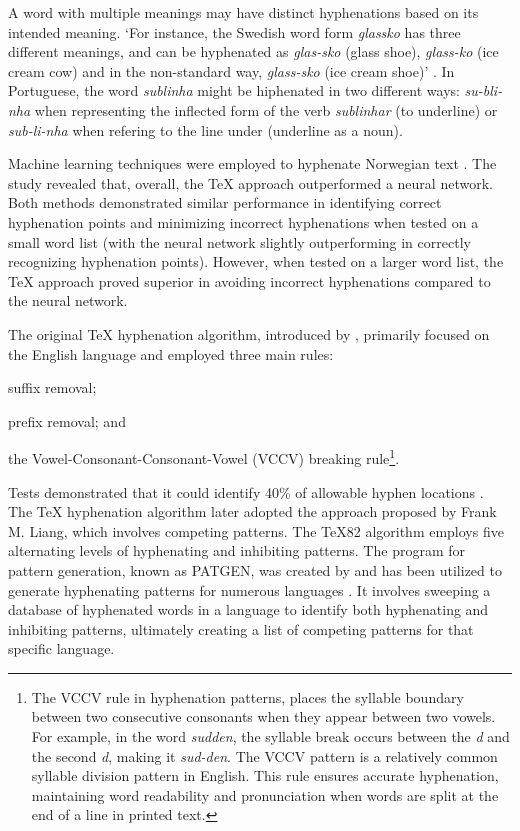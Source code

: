 \documentclass{article}
\begin{document}
A word with multiple meanings may have distinct hyphenations based on its intended meaning.
`For instance, the Swedish word form \emph{glassko} has three different
meanings, and can be hyphenated as \emph{glas-sko} (glass shoe),
\emph{glass-ko} (ice cream cow) and in the non-standard way,
\emph{glass-sko} (ice cream shoe)' \parencite{nemeth2006}. In Portuguese, the
word \emph{sublinha} might be hiphenated in two different ways:
\emph{su-bli-nha} when representing the inflected form of the verb
\emph{sublinhar} (to underline) or \emph{sub-li-nha} when refering
to the line under (underline as a noun).


Machine learning techniques were employed to hyphenate Norwegian text
\parencite{kristensen2001}. The study revealed that, overall, the \TeX{} approach
outperformed a neural network.  Both methods demonstrated similar performance
in identifying correct hyphenation points and minimizing incorrect hyphenations
when tested on a small word list (with the neural network slightly
outperforming in correctly recognizing hyphenation points).  However, when
tested on a larger word list, the \TeX{} approach proved superior in avoiding
incorrect hyphenations compared to the neural network.


The original \TeX{} hyphenation algorithm, introduced by %
\textcite{knuth1977}, primarily focused on the English language and employed three
main rules:
\begin{enumerate*}[label=(\arabic*)]
 \item suffix removal; 
 \item prefix removal; and 
 \item the Vowel-Consonant-Consonant-Vowel (VCCV) breaking rule\footnote{The 
     VCCV rule in hyphenation patterns, places the syllable boundary between 
     two consecutive consonants when they appear between two vowels. For example, 
     in the word \emph{sudden}, the syllable break occurs between the \emph{d} and 
     the second \emph{d}, making it \emph{sud-den}. 
     The VCCV pattern is a relatively common syllable division pattern in English.
     This rule ensures accurate 
     hyphenation, maintaining word readability and pronunciation when words are 
     split at the end of a line in printed text.}. 
\end{enumerate*}
Tests demonstrated that it could identify 40\% of allowable hyphen locations
\parencite{liang1983}.  The \TeX{} hyphenation algorithm later adopted the approach
proposed by Frank M. Liang, which involves competing patterns.  The \TeX{}82
algorithm employs five alternating levels of hyphenating and inhibiting
patterns. The program for pattern generation, known as PATGEN, was created by
\parencite{liangbreitenlohner1999} and has been utilized to generate
hyphenating patterns for numerous languages
\parencite{sojka1995,sojka1995a,sojka2005thesis,sojka2003,scannell2003}. It involves
sweeping a database of hyphenated words in a language to identify both
hyphenating and inhibiting patterns, ultimately creating a list of competing
patterns for that specific language.
\end{document}

